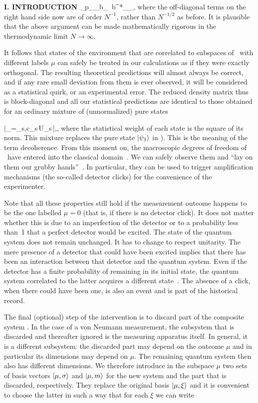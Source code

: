 \begin{center}{\bf I. INTRODUCTION}
\beq \sum_\omega p_\omega \sum_\alpha b_{\mu\omega\alpha}\,
  b^*_{\nu\omega\alpha}\simeq \delta_{\mu\nu}, \eeq
where the off-diagonal terms on the right hand side now are of order
$N^{-1}$, rather than $N^{-1/2}$ as before. It is plausible that the
above argument can be made mathematically rigorous in the thermodynamic
limit $N\to\infty$.

It follows that states of the environment that are correlated to
subspaces of \cC\ with different labels $\mu$ can safely be treated in
our calculations as if they were exactly orthogonal. The resulting
theoretical predictions will almost always be correct, and if any rare
small deviation from them is ever observed, it will be considered as a
statistical quirk, or an experimental error. The reduced density matrix
thus is block-diagonal and all our statistical predictions are identical
to those obtained for an ordinary mixture of (unnormalized) pure states

\beq |\psi_\mu\9=\sum_{s,\xi}c_s\,U_{s\mu\xi}\,|\mu,\xi\9,
 \label{psimu} \eeq
where the statistical weight of each state is the square of its norm.
This mixture replaces the pure state $|\psi_1\rangle$ in ). This is
the meaning of the term decoherence. From this moment on, the
macroscopic degrees of freedom of \cC\ have entered into the classical
domain~\cite{Bohr1939,hay}. We can safely observe them and ``lay on them
our grubby hands''~\cite{caves}. In particular, they can be used to
trigger amplification mechanisms (the so-called detector clicks) for the
convenience of the experimenter. 

Note that all these properties still hold if the measurement outcome
happens to be the one labelled $\mu=0$ (that is, if there is no detector
click). It does not matter whether this is due to an imperfection of the
detector or to a probability less than~1 that a perfect detector would
be excited. The state of the quantum system does not remain unchanged.
It has to change to respect unitarity. The mere presence of a detector
that could have been excited implies that there has been an interaction
between that detector and the quantum system. Even if the detector has a
finite probability of remaining in its initial state, the quantum system
correlated to the latter acquires a different state~\cite{Dicke}. The
absence of a click, when there could have been one, is also an event and
is part of the historical record.

The final (optional) step of the intervention is to discard part of the
composite system \cC. In the case of a von Neumann measurement, the
subsystem that is discarded and thereafter ignored is the measuring
apparatus itself. In general, it is a different subsystem: the discarded
part may depend on the outcome $\mu$ and in particular its dimensions
may depend on $\mu$. The remaining quantum system then also has
different dimensions. We therefore introduce in the subspace $\mu$ two
sets of basis vectors $|\mu,\sigma\rangle$ and $|\mu,m\rangle$ for the new system
and the part that is discarded, respectively. They replace the original
basis $|\mu,\xi\rangle$ and it is convenient to choose the latter in such a
way that for each $\xi$ we can write


\end{center}
